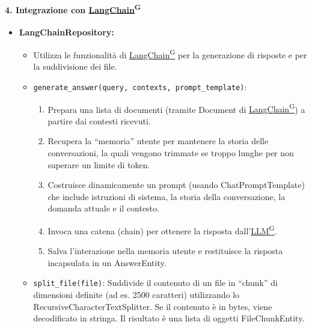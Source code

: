     \paragraph{4. Integrazione con \href{https://code7crusaders.github.io/docs/\href{https://code7crusaders.github.io/docs/PB/documentazione_interna/glossario.html#pb-product-baseline}{PB\textsuperscript{G}}/documentazione_interna/glossario.html#langchain}{LangChain}\textsuperscript{G}}
    \begin{itemize}
        \item \textbf{LangChainRepository:}
        \begin{itemize}
            \item Utilizza le funzionalità di \href{https://code7crusaders.github.io/docs/\href{https://code7crusaders.github.io/docs/PB/documentazione_interna/glossario.html#pb-product-baseline}{PB\textsuperscript{G}}/documentazione_interna/glossario.html#langchain}{LangChain\textsuperscript{G}} per la generazione di risposte e per la suddivisione dei file.
            \item \texttt{generate\_answer(query, contexts, prompt\_template)}:
            \begin{enumerate}
                \item Prepara una lista di documenti (tramite Document di \href{https://code7crusaders.github.io/docs/\href{https://code7crusaders.github.io/docs/PB/documentazione_interna/glossario.html#pb-product-baseline}{PB\textsuperscript{G}}/documentazione_interna/glossario.html#langchain}{LangChain\textsuperscript{G}}) a partire dai contesti ricevuti.
                \item Recupera la “memoria” utente per mantenere la storia delle conversazioni, la quali vengono trimmate se troppo lunghe per non superare un limite di token.
                \item Costruisce dinamicamente un prompt (usando ChatPromptTemplate) che include istruzioni di sistema, la storia della conversazione, la domanda attuale e il contesto.
                \item Invoca una catena (chain) per ottenere la risposta dall’\href{https://code7crusaders.github.io/docs/\href{https://code7crusaders.github.io/docs/PB/documentazione_interna/glossario.html#pb-product-baseline}{PB\textsuperscript{G}}/documentazione_interna/glossario.html#llm-large-language-model}{LLM\textsuperscript{G}}.
                \item Salva l’interazione nella memoria utente e restituisce la risposta incapsulata in un AnswerEntity.
            \end{enumerate}
            \item \texttt{split\_file(file)}: Suddivide il contenuto di un file in “chunk” di dimensioni definite (ad es. 2500 caratteri) utilizzando lo RecursiveCharacterTextSplitter. Se il contenuto è in bytes, viene decodificato in stringa. Il risultato è una lista di oggetti FileChunkEntity.
        \end{itemize}
    \end{itemize}

